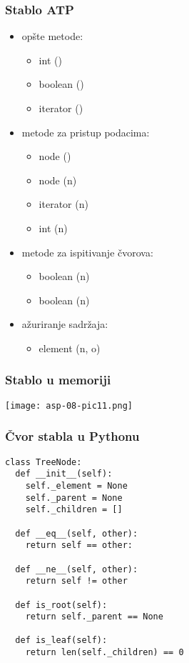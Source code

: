 \documentclass[compress,aspectratio=169]{beamer}
\begin{document}
\begin{frame}[fragile]
  \frametitle{Stablo ATP}
  \begin{itemize}
    \item opšte metode:
    \begin{itemize}
      \item int ()
      \item boolean ()
      \item iterator ()
    \end{itemize}
    \item metode za pristup podacima:
    \begin{itemize}
      \item node ()
      \item node (n)
      \item iterator (n)
      \item int (n)
    \end{itemize}
    \item metode za ispitivanje čvorova:
    \begin{itemize}
      \item boolean (n)
      \item boolean (n)
    \end{itemize}
    \item ažuriranje sadržaja:
    \begin{itemize}
      \item element (n, o)
    \end{itemize}
  \end{itemize}
\end{frame}

\begin{frame}[fragile]
  \frametitle{Stablo u memoriji}
\begin{center}
  \texttt{[image: asp-08-pic11.png]}
\end{center}
\end{frame}

\begin{frame}
  \frametitle{Čvor stabla u Pythonu}
\begin{verbatim}
class TreeNode:
  def __init__(self):
    self._element = None
    self._parent = None
    self._children = []
  
  def __eq__(self, other):
    return self == other:
    
  def __ne__(self, other):
    return self != other
  
  def is_root(self):
    return self._parent == None
    
  def is_leaf(self):
    return len(self._children) == 0
\end{verbatim}
\end{frame}
\end{document}
